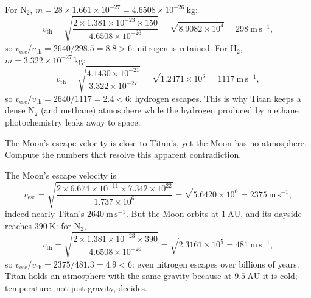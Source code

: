 \begin{solution}
For $\mathrm{N_2}$, $m = 28 \times 1.661 \times 10^{-27} = 4.6508 \times 10^{-26}\ \mathrm{kg}$:
\[
  v_{\mathrm{th}} = \sqrt{\frac{2 \times 1.381 \times 10^{-23} \times 150}{4.6508 \times 10^{-26}}}
                  = \sqrt{8.9082 \times 10^{4}} = 298\ \mathrm{m\,s^{-1}},
\]
so $v_{\mathrm{esc}}/v_{\mathrm{th}} = 2640/298.5 = 8.8 > 6$: nitrogen is retained.
For $\mathrm{H_2}$, $m = 3.322 \times 10^{-27}\ \mathrm{kg}$:
\[
  v_{\mathrm{th}} = \sqrt{\frac{4.1430 \times 10^{-21}}{3.322 \times 10^{-27}}}
                  = \sqrt{1.2471 \times 10^{6}} = 1117\ \mathrm{m\,s^{-1}},
\]
so $v_{\mathrm{esc}}/v_{\mathrm{th}} = 2640/1117 = 2.4 < 6$: hydrogen escapes.
This is why Titan keeps a dense $\mathrm{N_2}$ (and methane) atmosphere while the hydrogen produced by methane photochemistry leaks away to space.
\end{solution}

\parti {} The Moon's escape velocity is close to Titan's, yet the Moon has no atmosphere.
Compute the numbers that resolve this apparent contradiction.

\begin{solution}
The Moon's escape velocity is
\[
  v_{\mathrm{esc}} = \sqrt{\frac{2 \times 6.674 \times 10^{-11} \times 7.342 \times 10^{22}}{1.737 \times 10^{6}}}
    = \sqrt{5.6420 \times 10^{6}} = 2375\ \mathrm{m\,s^{-1}},
\]
indeed nearly Titan's $2640\ \mathrm{m\,s^{-1}}$.
But the Moon orbits at $1\ \mathrm{AU}$, and its dayside reaches $390\ \mathrm{K}$: for $\mathrm{N_2}$,
\[
  v_{\mathrm{th}} = \sqrt{\frac{2 \times 1.381 \times 10^{-23} \times 390}{4.6508 \times 10^{-26}}}
                  = \sqrt{2.3161 \times 10^{5}} = 481\ \mathrm{m\,s^{-1}},
\]
so $v_{\mathrm{esc}}/v_{\mathrm{th}} = 2375/481.3 = 4.9 < 6$: even nitrogen escapes over billions of years.
Titan holds an atmosphere with the same gravity because at $9.5\ \mathrm{AU}$ it is cold; temperature, not just gravity, decides.
\end{solution}



